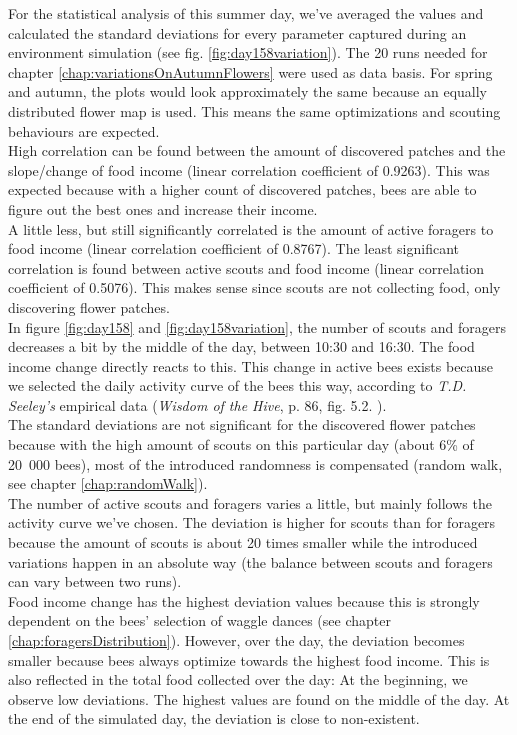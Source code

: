 		For the statistical analysis of this summer day, we've averaged the values and calculated the standard deviations for every parameter captured during an environment simulation (see fig. \ref{fig:day158variation}). The 20 runs needed for chapter \ref{chap:variationsOnAutumnFlowers} were used as data basis. For spring and autumn, the plots would look approximately the same because an equally distributed flower map is used. This means the same optimizations and scouting behaviours are expected.\\
		High correlation can be found between the amount of discovered patches and the slope/change of food income (linear correlation coefficient of 0.9263). This was expected because with a higher count of discovered patches, bees are able to figure out the best ones and increase their income.\\
		A little less, but still significantly correlated is the amount of active foragers to food income (linear correlation coefficient of 0.8767). The least significant correlation is found between active scouts and food income (linear correlation coefficient of 0.5076). This makes sense since scouts are not collecting food, only discovering flower patches.\\
		In figure \ref{fig:day158} and \ref{fig:day158variation}, the number of scouts and foragers decreases a bit by the middle of the day, between 10:30 and 16:30. The food income change directly reacts to this. This change in active bees exists because we selected the daily activity curve of the bees this way, according to \textit{T.D. Seeley's} empirical data (\textit{Wisdom of the Hive}, p. 86, fig. 5.2. \cite{seeley95}).\\
		
		The standard deviations are not significant for the discovered flower patches because with the high amount of scouts on this particular day (about 6\% of 20~000 bees), most of the introduced randomness is compensated (random walk, see chapter \ref{chap:randomWalk}).\\
		The number of active scouts and foragers varies a little, but mainly follows the activity curve we've chosen. The deviation is higher for scouts than for foragers because the amount of scouts is about 20 times smaller while the introduced variations happen in an absolute way (the balance between scouts and foragers can vary between two runs).\\
		Food income change has the highest deviation values because this is strongly dependent on the bees' selection of waggle dances (see chapter \ref{chap:foragersDistribution}). However, over the day, the deviation becomes smaller because bees always optimize towards the highest food income. This is also reflected in the total food collected over the day: At the beginning, we observe low deviations. The highest values are found on the middle of the day. At the end of the simulated day, the deviation is close to non-existent.
		
